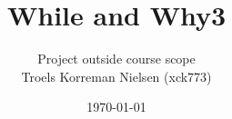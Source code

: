 \documentclass[12pt, a4paper, notitlepage, oneside]{article}
\begin{document}
    \setcounter{secnumdepth}{3}
    \setcounter{tocdepth}{3}


    \nonfrenchspacing

    \title{While and Why3}
    \author{Project outside course scope\\
        Troels Korreman Nielsen (xck773)}
    \date{\today}
    \maketitle
    \tableofcontents
    \newpage

    
    \newpage
    
    
    
    
    
    
    

    
    

    \appendix
    
\end{document}
